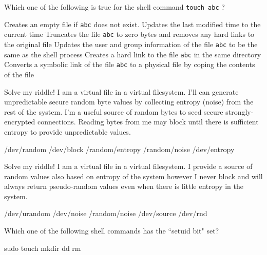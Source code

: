 

\variant
Which one of the following is true for the shell command {\tt touch abc} ?
\begin{answers}
\correctanswer Creates an empty file if {\tt abc} does not exist. Updates the last modified time to the current time
\answer Truncates the file {\tt abc} to zero bytes and removes any hard links to the original file
\answer Updates the user and group information of the file {\tt abc} to be the same as the shell process
\answer Creates a hard link to the file {\tt abc} in the same directory
\answer Converts a symbolic link of the file {\tt abc} to a physical file by coping the contents of the file
\end{answers}
\begin{solution}
\end{solution}

\variant
Solve my riddle! I am a virtual file in a virtual filesystem. I'll can generate unpredictable secure random byte values by collecting entropy (noise) from the rest of the system. I'm a useful source of random bytes to seed secure strongly-encrypted connections. Reading bytes from me may block until there is sufficient entropy to provide unpredictable values.
\begin{answers}
\correctanswer /dev/random
\answer /dev/block
\answer /random/entropy
\answer /random/noise
\answer /dev/entropy
\end{answers}
\begin{solution}
\end{solution}

\variant
Solve my riddle! I am a virtual file in a virtual filesystem. I provide a source of random values also based on entropy of the system however I never block and will always return pseudo-random values even when there is little entropy in the system.
\begin{answers}
\correctanswer  /dev/urandom
\answer /dev/noise
\answer /random/noise
\answer  /dev/source
\answer /dev/rnd
\end{answers}
\begin{solution}
\end{solution}

\variant
Which one of the following shell commands has the ``setuid bit" set?
\begin{answers}
\correctanswer sudo
\answer touch
\answer mkdir
\answer dd
\answer rm
\end{answers}
\begin{solution}
\end{solution}




